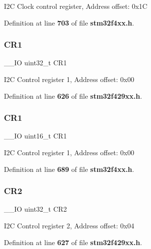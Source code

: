 I2C Clock control register, Address offset\+: 0x1C 

Definition at line \textbf{ 703} of file \textbf{ stm32f4xx.\+h}.

\mbox{\label{structI2C__TypeDef_ab0ec7102960640751d44e92ddac994f0}} 
\subsubsection{C\+R1\hspace{0.1cm}{\footnotesize\ttfamily [1/2]}}
{\footnotesize\ttfamily \+\_\+\+\_\+\+IO uint32\+\_\+t C\+R1}

I2C Control register 1, Address offset\+: 0x00 

Definition at line \textbf{ 626} of file \textbf{ stm32f429xx.\+h}.

\mbox{\label{structI2C__TypeDef_a61400ce239355b62aa25c95fcc18a5e1}} 
\subsubsection{C\+R1\hspace{0.1cm}{\footnotesize\ttfamily [2/2]}}
{\footnotesize\ttfamily \+\_\+\+\_\+\+IO uint16\+\_\+t C\+R1}

I2C Control register 1, Address offset\+: 0x00 

Definition at line \textbf{ 689} of file \textbf{ stm32f4xx.\+h}.

\mbox{\label{structI2C__TypeDef_afdfa307571967afb1d97943e982b6586}} 
\subsubsection{C\+R2\hspace{0.1cm}{\footnotesize\ttfamily [1/2]}}
{\footnotesize\ttfamily \+\_\+\+\_\+\+IO uint32\+\_\+t C\+R2}

I2C Control register 2, Address offset\+: 0x04 

Definition at line \textbf{ 627} of file \textbf{ stm32f429xx.\+h}.

\mbox{\label{structI2C__TypeDef_a2a3e81bd118d1bc52d24a0b0772e6a0c}} 
